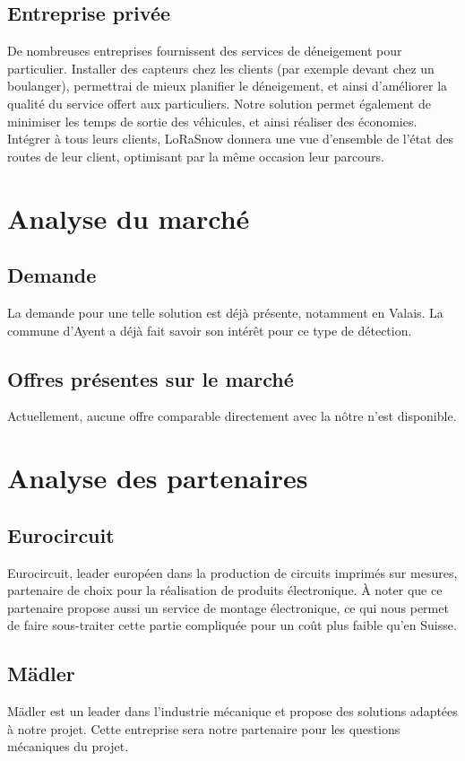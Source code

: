 \subsection{Entreprise privée}
De nombreuses entreprises fournissent des services de déneigement pour particulier.
Installer des capteurs chez les clients (par exemple devant chez un boulanger),
permettrai de mieux planifier le déneigement, et ainsi d'améliorer la qualité
du service offert aux particuliers.
Notre solution permet également de minimiser les temps de sortie des véhicules,
et ainsi réaliser des économies.
Intégrer à tous leurs clients, LoRaSnow donnera une vue d'ensemble de l'état
des routes de leur client, optimisant par la même occasion leur parcours.

\section{Analyse du marché}
\subsection{Demande}
La demande pour une telle solution est déjà présente, notamment en Valais.
La commune d'Ayent a déjà fait savoir son intérêt pour ce type de détection.

\subsection{Offres présentes sur le marché}
Actuellement, aucune offre comparable directement avec la nôtre n'est disponible.

\section{Analyse des partenaires}
\subsection{Eurocircuit}
Eurocircuit, leader européen dans la production de circuits imprimés sur mesures,
partenaire de choix pour la réalisation de produits électronique.
À noter que ce partenaire propose aussi un service de montage électronique,
ce qui nous permet de faire sous-traiter cette partie compliquée pour
un coût plus faible qu'en Suisse.

\subsection{Mädler}
Mädler est un leader dans l'industrie mécanique et propose des solutions adaptées à notre projet.
Cette entreprise sera notre partenaire pour les questions mécaniques du projet.

